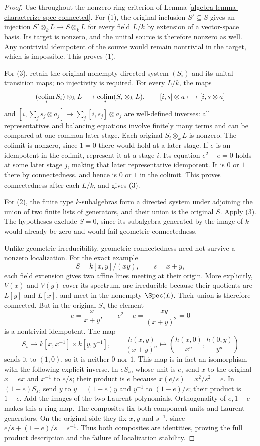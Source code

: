 \begin{proof}
Use throughout the nonzero-ring
criterion of Lemma
\ref{algebra-lemma-characterize-spec-connected}.
For (1), the original inclusion
$S'\subseteq S$ gives an injection
$S'\otimes_k L\to S\otimes_k L$
for every field $L/k$ by extension
of a vector-space basis. Its
target is nonzero, and the
unital source is therefore
nonzero as well. Any nontrivial
idempotent of the source would
remain nontrivial in the target,
which is impossible. This proves (1).

For (3), retain the original
nonempty directed system $(S_i)$
and its unital transition maps;
no injectivity is required.
For every $L/k$, the maps
$$
(\mathop{\rm colim}_i S_i)\otimes_k L
\longrightarrow\mathop{\rm colim}_i(S_i\otimes_k L),
\qquad[i,s]\otimes a\longmapsto[i,s\otimes a]
$$
and $[i,\sum_j s_j\otimes a_j]\mapsto\sum_j[i,s_j]\otimes a_j$
are well-defined inverses:
all representatives and balancing
equations involve finitely many
terms and can be compared at
one common later stage.
Each original $S_i\otimes_k L$
is nonzero. The colimit is
nonzero, since $1=0$ there
would hold at a later stage.
If $e$ is an idempotent in
the colimit, represent it at
a stage $i$. Its equation
$e^2-e=0$ holds at some later
stage $j$, making that later
representative idempotent.
It is $0$ or $1$ there by
connectedness, and hence is
$0$ or $1$ in the colimit.
This proves connectedness after
each $L/k$, and gives (3).

For (2), the finite type
$k$-subalgebras form a directed
system under adjoining the union
of two finite lists of generators,
and their union is the original
$S$. Apply (3). The hypotheses
exclude $S=0$, since its
subalgebra generated by the
image of $k$ would already
be zero and would fail
geometric connectedness.

Unlike geometric irreducibility,
geometric connectedness need
not survive a nonzero localization.
For the exact example
$$
S=k[x,y]/(xy),\qquad s=x+y,
$$
each field extension gives
two affine lines meeting at
their origin. More explicitly,
$V(x)$ and $V(y)$ cover its
spectrum, are irreducible
because their quotients are
$L[y]$ and $L[x]$, and meet
in the nonempty $\Spec(L)$.
Their union is therefore
connected. But in the original
$S_s$ the element
$$
e=\frac{x}{x+y},\qquad
e^2-e=\frac{-xy}{(x+y)^2}=0
$$
is a nontrivial idempotent.
The map
$$
S_s\longrightarrow k[x,x^{-1}]\times k[y,y^{-1}],
\qquad\frac{h(x,y)}{(x+y)^n}
\longmapsto\left(\frac{h(x,0)}{x^n},\frac{h(0,y)}{y^n}\right)
$$
sends it to $(1,0)$, so it
is neither $0$ nor $1$.
This map is in fact an
isomorphism with the following
explicit inverse. In $eS_s$,
whose unit is $e$, send $x$
to the original $x=ex$ and
$x^{-1}$ to $e/s$; their
product is $e$ because
$x(e/s)=x^2/s^2=e$.
In $(1-e)S_s$, send $y$ to
$y=(1-e)y$ and $y^{-1}$ to
$(1-e)/s$; their product is
$1-e$. Add the images of
the two Laurent polynomials.
Orthogonality of $e,1-e$
makes this a ring map.
The composites fix both
component units and Laurent
generators. On the original
side they fix $x,y$ and
$s^{-1}$, since
$e/s+(1-e)/s=s^{-1}$.
Thus both composites are
identities, proving the full
product description and the
failure of localization stability.
\end{proof}



